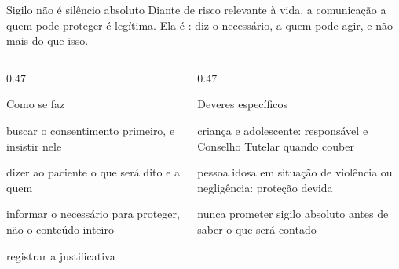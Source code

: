\begin{frame}{}
\begin{caixanorma}{Sigilo n\~ao \'e sil\^encio absoluto}
Diante de risco relevante \`a vida, a comunica\c{c}\~ao a quem pode proteger \'e
leg\'itima. Ela \'e : diz o
necess\'ario, a quem pode agir, e n\~ao mais do que isso.
\end{caixanorma}

\CRvg
\begin{columns}[onlytextwidth, t]
\begin{column}{0.47\textwidth}
\begin{caixaproteger}{Como se faz}
\begin{itemc}
\item buscar o consentimento primeiro, e insistir nele
\item dizer ao paciente o que ser\'a dito e a quem
\item informar o necess\'ario para proteger, n\~ao o conte\'udo inteiro
\item registrar a justificativa
\end{itemc}
\end{caixaproteger}
\end{column}
\calha
\begin{column}{0.47\textwidth}
\begin{caixanorma}{Deveres espec\'ificos}
\begin{itemc}
\item crian\c{c}a e adolescente: respons\'avel e Conselho Tutelar quando couber
\item pessoa idosa em situa\c{c}\~ao de viol\^encia ou neglig\^encia: prote\c{c}\~ao devida
\item nunca prometer sigilo absoluto antes de saber o que ser\'a contado
\end{itemc}
\end{caixanorma}
\end{column}
\end{columns}
\end{frame}
